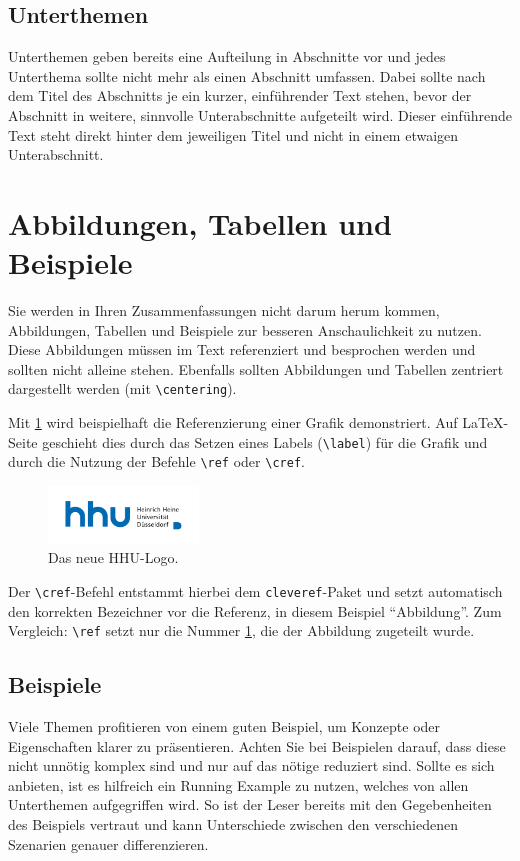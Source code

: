 \documentclass{hhuarticle}
\begin{document}
  \subsection{Unterthemen}
  Unterthemen geben bereits eine Aufteilung in Abschnitte vor und jedes
  Unterthema sollte nicht mehr als einen Abschnitt umfassen.
  Dabei sollte nach dem Titel des Abschnitts je ein
  kurzer, einführender Text stehen, bevor der Abschnitt in weitere,
  sinnvolle Unterabschnitte aufgeteilt wird.
  Dieser einführende Text steht direkt hinter dem jeweiligen Titel und
  nicht in einem etwaigen Unterabschnitt.


  \section{Abbildungen, Tabellen und Beispiele}

  Sie werden in Ihren Zusammenfassungen nicht darum herum kommen,
  Abbildungen, Tabellen und Beispiele zur besseren Anschaulichkeit zu nutzen.
  Diese Abbildungen müssen im Text referenziert und besprochen werden
  und sollten nicht alleine stehen.
  Ebenfalls sollten Abbildungen und Tabellen zentriert dargestellt werden
  (mit \texttt{\textbackslash centering}).

  Mit \cref{fig:initial-draft} wird beispielhaft die Referenzierung einer Grafik
  demonstriert.
  Auf \LaTeX-Seite geschieht dies durch das Setzen eines Labels
  (\texttt{\textbackslash label}) für die Grafik
  und durch die Nutzung der Befehle
  \texttt{\textbackslash ref} oder \texttt{\textbackslash cref}.

  \begin{figure}[h]
    \centering
    \includegraphics[width=4cm]{fig/hhulogo.pdf}
    \caption{Das neue HHU-Logo.}%
    \label{fig:initial-draft}
  \end{figure}

  Der \texttt{\textbackslash cref}-Befehl entstammt hierbei dem
  \texttt{cleveref}-Paket und setzt automatisch den korrekten Bezeichner
  vor die Referenz, in diesem Beispiel ``Abbildung''.
  Zum Vergleich: \texttt{\textbackslash ref} setzt nur die
  Nummer \ref{fig:initial-draft}, die der Abbildung zugeteilt wurde.

  \subsection{Beispiele}
  Viele Themen profitieren von einem guten Beispiel,
  um Konzepte oder Eigenschaften klarer zu präsentieren.
  Achten Sie bei Beispielen darauf,
  dass diese nicht unnötig komplex sind und nur auf das nötige reduziert sind.
  Sollte es sich anbieten, ist es hilfreich ein Running Example zu nutzen,
  welches von allen Unterthemen aufgegriffen wird.
  So ist der Leser bereits mit den Gegebenheiten des Beispiels vertraut
  und kann Unterschiede zwischen den verschiedenen Szenarien genauer
  differenzieren.
\end{document}
